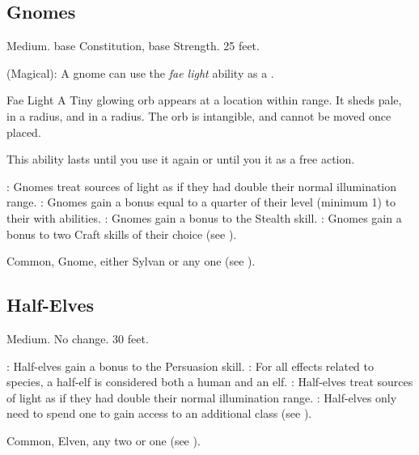     \subsection{Gnomes}
         Medium.
          base Constitution,  base Strength.
         25 feet.
        \begin{itemize}
             (Magical): A gnome can use the \textit{fae light} ability as a .
                \begin{freeability}{Fae Light}
                    A Tiny glowing orb appears at a location within \rngmed range.
                    It sheds pale,  in a \areasmall radius, and  in a \areamed radius.
                    The orb is intangible, and cannot be moved once placed.

                    This ability lasts until you use it again or until you  it as a free action.
                \end{freeability}
            : Gnomes treat sources of light as if they had double their normal illumination range.
            : Gnomes gain a bonus equal to a quarter of their level (minimum 1) to their  with  abilities.
            : Gnomes gain a  bonus to the Stealth skill.
            : Gnomes gain a  bonus to two Craft skills of their choice (see ).
        \end{itemize}
         Common, Gnome, either Sylvan or any one  (see ).

    \subsection{Half-Elves}\label{Half-Elves}
         Medium.
         No change.
         30 feet.
        \begin{itemize}
            : Half-elves gain a  bonus to the Persuasion skill.
            : For all effects related to species, a half-elf is considered both a human and an elf.
            : Half-elves treat sources of light as if they had double their normal illumination range.
            : Half-elves only need to spend one  to gain access to an additional class (see ).
        \end{itemize}
         Common, Elven, any two  or one  (see ).

